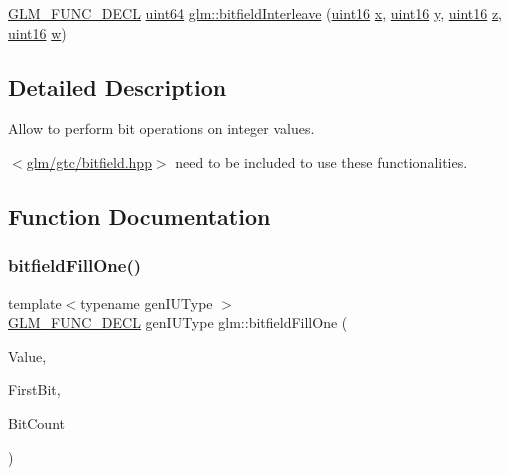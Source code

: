 \begin{DoxyCompactItemize}
\item 
\mbox{\hyperlink{setup_8hpp_ab2d052de21a70539923e9bcbf6e83a51}{G\+L\+M\+\_\+\+F\+U\+N\+C\+\_\+\+D\+E\+CL}} \mbox{\hyperlink{group__gtc__type__precision_gae3632bf9b37da66233d78930dd06378a}{uint64}} \mbox{\hyperlink{group__gtc__bitfield_gac8a926a7bfd9b23c22a4f685193fbfe1}{glm\+::bitfield\+Interleave}} (\mbox{\hyperlink{group__gtc__type__precision_gad8c2939e1fdd8e5828b31d95c52255d5}{uint16}} \mbox{\hyperlink{glad_8h_a92d0386e5c19fb81ea88c9f99644ab1d}{x}}, \mbox{\hyperlink{group__gtc__type__precision_gad8c2939e1fdd8e5828b31d95c52255d5}{uint16}} \mbox{\hyperlink{glad_8h_a66ddd433d2cacfe27f5906b7e86faeed}{y}}, \mbox{\hyperlink{group__gtc__type__precision_gad8c2939e1fdd8e5828b31d95c52255d5}{uint16}} \mbox{\hyperlink{glad_8h_acb78bf1972d3eaf07da34ff2e0a2f133}{z}}, \mbox{\hyperlink{group__gtc__type__precision_gad8c2939e1fdd8e5828b31d95c52255d5}{uint16}} \mbox{\hyperlink{glad_8h_a1d0296e9e835f2e1ee17634af95fc1ec}{w}})
\end{DoxyCompactItemize}


\subsection{Detailed Description}
Allow to perform bit operations on integer values. 

$<$\mbox{\hyperlink{bitfield_8hpp}{glm/gtc/bitfield.\+hpp}}$>$ need to be included to use these functionalities. 

\subsection{Function Documentation}
\mbox{\label{group__gtc__bitfield_ga46f9295abe3b5c7658f5b13c7f819f0a}} 
\subsubsection{\texorpdfstring{bitfieldFillOne()}{bitfieldFillOne()}\hspace{0.1cm}{\footnotesize\ttfamily [1/2]}}
{\footnotesize\ttfamily template$<$typename gen\+I\+U\+Type $>$ \\
\mbox{\hyperlink{setup_8hpp_ab2d052de21a70539923e9bcbf6e83a51}{G\+L\+M\+\_\+\+F\+U\+N\+C\+\_\+\+D\+E\+CL}} gen\+I\+U\+Type glm\+::bitfield\+Fill\+One (\begin{DoxyParamCaption}\item[{gen\+I\+U\+Type}]{Value,  }\item[{int}]{First\+Bit,  }\item[{int}]{Bit\+Count }\end{DoxyParamCaption})}

